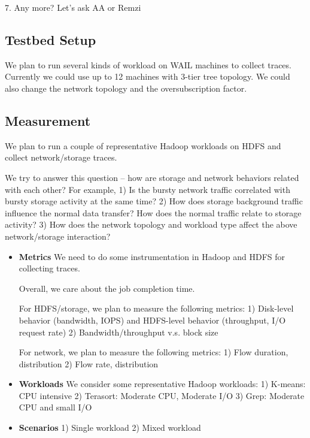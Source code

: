 7. Any more? Let's ask AA or Remzi






\subsection {\bf Testbed Setup}
We plan to run several kinds of workload on WAIL machines to collect traces. Currently we could use up to 12 machines with 3-tier tree topology. We could also change the network topology and the oversubscription factor. 

\subsection {\bf Measurement}
We plan to run a couple of representative Hadoop workloads on HDFS and collect network/storage traces.

We try to answer this question -- how are storage and network behaviors related with each other? For example,
1) Is the bursty network traffic correlated with bursty storage activity at the same time? 
2) How does storage background traffic influence the normal data transfer? How does the normal traffic relate to storage activity?
3) How does the network topology and workload type affect the above network/storage interaction?

\begin{itemize}
	\item {\bf Metrics}
We need to do some instrumentation in Hadoop and HDFS for collecting traces.

Overall, we care about the job completion time. 

For HDFS/storage, we plan to measure the following metrics:
1) Disk-level behavior (bandwidth, IOPS) and HDFS-level behavior (throughput, I/O request rate)
2) Bandwidth/throughput v.s. block size

For network, we plan to measure the following metrics:
1) Flow duration, distribution
2) Flow rate, distribution

	\item {\bf Workloads}
We consider some representative Hadoop workloads:
1) K-means: CPU intensive
2) Terasort: Moderate CPU, Moderate I/O
3) Grep: Moderate CPU and small I/O
	
	\item {\bf Scenarios}
1) Single workload
2) Mixed workload

\end{itemize}

